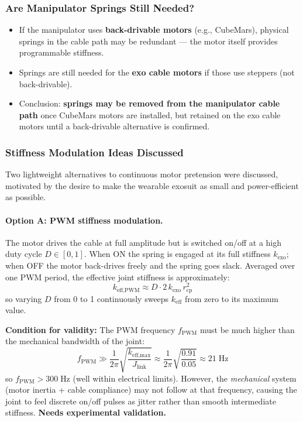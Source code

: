 \documentclass[11pt, a4paper]{article}
\begin{document}
\subsubsection*{Are Manipulator Springs Still Needed?}

\begin{itemize}[nosep]
  \item If the manipulator uses \textbf{back-drivable motors} (e.g.,
    CubeMars), physical springs in the cable path may be redundant ---
    the motor itself provides programmable stiffness.
  \item Springs are still needed for the \textbf{exo cable motors} if those
    use steppers (not back-drivable).
  \item Conclusion: \textbf{springs may be removed from the manipulator
    cable path} once CubeMars motors are installed, but retained on the
    exo cable motors until a back-drivable alternative is confirmed.
\end{itemize}

\subsubsection*{Stiffness Modulation Ideas Discussed}

Two lightweight alternatives to continuous motor pretension were discussed,
motivated by the desire to make the wearable exosuit as small and
power-efficient as possible.

\paragraph{Option A: PWM stiffness modulation.}

The motor drives the cable at full amplitude but is switched on/off at a
high duty cycle $D \in [0,1]$.  When ON the spring is engaged at its full
stiffness $k_{\text{exo}}$; when OFF the motor back-drives freely and the
spring goes slack.  Averaged over one PWM period, the effective joint
stiffness is approximately:
%
\begin{equation}\label{eq:pwm-keff}
  k_{\text{eff,PWM}} \approx D \cdot 2\,k_{\text{exo}}\,r_{\text{cp}}^2
\end{equation}
%
so varying $D$ from 0 to 1 continuously sweeps $k_{\text{eff}}$ from zero
to its maximum value.

\medskip\noindent
\textbf{Condition for validity:}  The PWM frequency $f_{\text{PWM}}$ must be
much higher than the mechanical bandwidth of the joint:
%
\begin{equation}
  f_{\text{PWM}} \gg \frac{1}{2\pi}\sqrt{\frac{k_{\text{eff,max}}}{J_{\text{link}}}}
  \approx \frac{1}{2\pi}\sqrt{\frac{0.91}{0.05}} \approx 21\;\text{Hz}
\end{equation}
%
so $f_{\text{PWM}} > 300\;\text{Hz}$ (well within electrical limits).
However, the \emph{mechanical} system (motor inertia + cable compliance)
may not follow at that frequency, causing the joint to feel discrete
on/off pulses as jitter rather than smooth intermediate stiffness.
\textbf{Needs experimental validation.}
\end{document}
